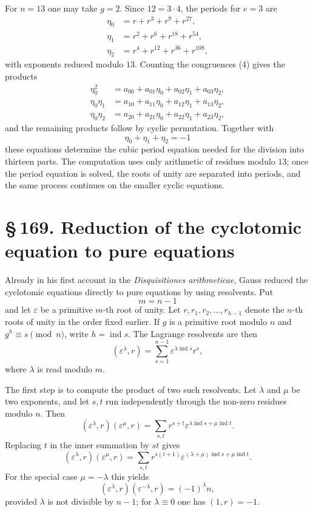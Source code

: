 \documentclass[11pt]{article}
\providecommand{\sect}[2]{\section*{\S\,#1. #2}}
\providecommand{\ind}{\operatorname{ind}}
\begin{document}
For $n=13$ one may take $g=2$. Since $12=3\cdot4$, the periods for $e=3$ are
\[
\begin{aligned}
        \eta_0&=r+r^3+r^9+r^{27},\\
        \eta_1&=r^2+r^6+r^{18}+r^{54},\\
        \eta_2&=r^4+r^{12}+r^{36}+r^{108},
\end{aligned}
\]
with exponents reduced modulo $13$. Counting the congruences (4) gives the products
\[
\begin{aligned}
        \eta_0^2&=a_{00}+a_{01}\eta_0+a_{02}\eta_1+a_{03}\eta_2,\\
        \eta_0\eta_1&=a_{10}+a_{11}\eta_0+a_{12}\eta_1+a_{13}\eta_2,\\
        \eta_0\eta_2&=a_{20}+a_{21}\eta_0+a_{22}\eta_1+a_{23}\eta_2,
\end{aligned}                                                          \tag{5}
\]
and the remaining products follow by cyclic permutation. Together with
\[
        \eta_0+
        \eta_1+
        \eta_2=-1                                                       \tag{6}
\]
these equations determine the cubic period equation needed for the division into thirteen parts. The computation uses only arithmetic of residues modulo $13$; once the period equation is solved, the roots of unity are separated into periods, and the same process continues on the smaller cyclic equations.

\sect{169}{Reduction of the cyclotomic equation to pure equations}

Already in his first account in the \emph{Disquisitiones arithmeticae}, Gauss reduced the cyclotomic equations directly to pure equations by using resolvents. Put
\[
        m=n-1
\]
and let $\varepsilon$ be a primitive $m$-th root of unity. Let $r,r_1,r_2,\ldots,r_{h-1}$ denote the $n$-th roots of unity in the order fixed earlier. If $g$ is a primitive root modulo $n$ and $g^h\equiv s\pmod n$, write $h=\ind s$. The Lagrange resolvents are then
\[
        (\varepsilon^\lambda,r)=
        \sum_{s=1}^{n-1}\varepsilon^{\lambda\ind s}r^s,                         \tag{1}
\]
where $\lambda$ is read modulo $m$.

The first step is to compute the product of two such resolvents. Let $\lambda$ and $\mu$ be two exponents, and let $s,t$ run independently through the non-zero residues modulo $n$. Then
\[
 (\varepsilon^\lambda,r)(\varepsilon^\mu,r)=
 \sum_{s,t} r^{s+t}\varepsilon^{\lambda\ind s+\mu\ind t}.
\]
Replacing $t$ in the inner summation by $st$ gives
\[
 (\varepsilon^\lambda,r)(\varepsilon^\mu,r)=
 \sum_{s,t} r^{s(t+1)}
 \varepsilon^{(\lambda+\mu)\ind s+\mu\ind t}.                         \tag{2}
\]
For the special case $\mu=-\lambda$ this yields
\[
        (\varepsilon^\lambda,r)(\varepsilon^{-\lambda},r)=(-1)^\lambda n,       \tag{3}
\]
provided $\lambda$ is not divisible by $n-1$; for $\lambda\equiv0$ one has $(1,r)=-1$.
\end{document}

